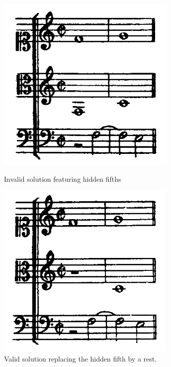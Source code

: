 \begin{enumerate}[wide, label=\bfseries 4.P\arabic*]
    \begin{figure}[h]
        \centering
        \begin{minipage}{0.26\textwidth}
            \centering
            \includegraphics[width=\textwidth]{Images/hidden-fifths-1.png}
            \caption{Invalid solution featuring hidden fifths}
            \label{fig:hidden-fifths-1}
        \end{minipage}
        \hfill
        \begin{minipage}{0.26\textwidth}
            \centering
            \includegraphics[width=\textwidth]{Images/hidden-fifths-2.png}
            \caption{Valid solution replacing the hidden fifth by a rest.}
            \label{fig:hidden-fifths-2}
        \end{minipage}
    \end{figure}


\end{enumerate}
